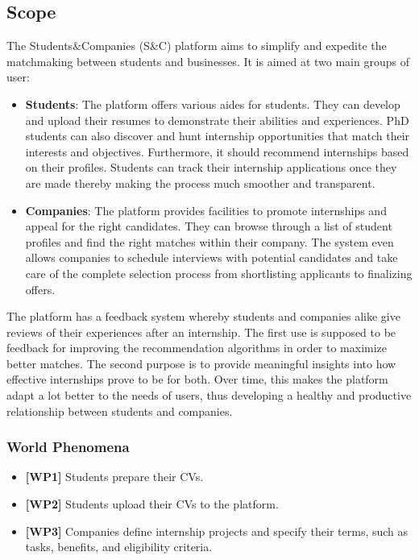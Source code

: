 \documentclass[12pt]{article}
\numberwithin{figure}{section}
\numberwithin{table}{section}
\begin{document}
\subsection{Scope}
The Students\&Companies (S\&C) platform aims to simplify and expedite the matchmaking between students and businesses. It is aimed at two main groups of user:

\begin{itemize}
    \item \textbf{Students}: The platform offers various aides for students. They can develop and upload their resumes to demonstrate their abilities and experiences. PhD students can also discover and hunt internship opportunities that match their interests and objectives. Furthermore, it should recommend internships based on their profiles. Students can track their internship applications once they are made thereby making the process much smoother and transparent.
    \item \textbf{Companies}: The platform provides facilities to promote internships and appeal for the right candidates. They can browse through a list of student profiles and find the right matches within their company. The system even allows companies to schedule interviews with potential candidates and take care of the complete selection process from shortlisting applicants to finalizing offers.
\end{itemize}

The platform has a feedback system whereby students and companies alike give reviews of their experiences after an internship. The first use is supposed to be feedback for improving the recommendation algorithms in order to maximize better matches. The second purpose is to provide meaningful insights into how effective internships prove to be for both. Over time, this makes the platform adapt a lot better to the needs of users, thus developing a healthy and productive relationship between students and companies.

\subsubsection{World Phenomena}
\begin{itemize}
    \item \textbf{[WP1]} Students prepare their CVs.
    \item \textbf{[WP2]} Students upload their CVs to the platform.
    \item \textbf{[WP3]} Companies define internship projects and specify their terms, such as tasks, benefits, and eligibility criteria.
\end{itemize}
\end{document}
